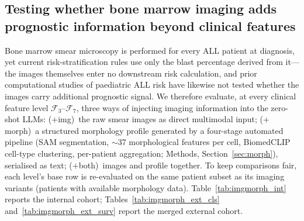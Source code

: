 \documentclass[pdflatex,sn-nature]{sn-jnl}
\begin{document}
\subsection{Testing whether bone marrow imaging adds prognostic
information beyond clinical features}
\label{sec:imgmorph}

Bone marrow smear microscopy is performed for every ALL patient at
diagnosis, yet current risk-stratification rules use only the blast
percentage derived from it—the images themselves enter no downstream
risk calculation, and prior computational studies of paediatric ALL
risk have likewise not tested whether the images carry additional
prognostic signal.
We therefore evaluate, at every clinical feature level
$\mathcal{F}_3$--$\mathcal{F}_7$, three ways of injecting imaging
information into the zero-shot LLMs:
($+$img)~the raw smear images as direct multimodal input;
($+$morph)~a structured morphology profile generated by a four-stage
automated pipeline (SAM segmentation, $\sim$37 morphological features
per cell, BiomedCLIP cell-type clustering, per-patient aggregation;
Methods, Section~\ref{sec:morph}), serialised as text;
($+$both)~images and profile together.
To keep comparisons fair, each level's base row is re-evaluated on the
same patient subset as its imaging variants (patients with available
morphology data).
Table~\ref{tab:imgmorph_int} reports the internal cohort;
Tables~\ref{tab:imgmorph_ext_cls} and~\ref{tab:imgmorph_ext_surv}
report the merged external cohort.
\end{document}
